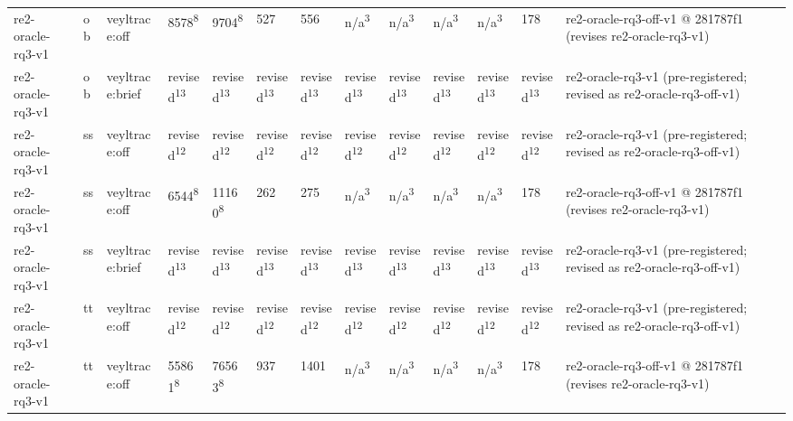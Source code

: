 \begin{table}[t]
\begin{tabular}{lllllllllllll}
re2-oracle-rq3-v1 & ob & veyltrace:off & 8578\textsuperscript{8} & 9704\textsuperscript{8} & 527 & 556 & n/a\textsuperscript{3} & n/a\textsuperscript{3} & n/a\textsuperscript{3} & n/a\textsuperscript{3} & 178 & re2-oracle-rq3-off-v1 @ 281787f1 (revises re2-oracle-rq3-v1) \\
re2-oracle-rq3-v1 & ob & veyltrace:brief & revised\textsuperscript{13} & revised\textsuperscript{13} & revised\textsuperscript{13} & revised\textsuperscript{13} & revised\textsuperscript{13} & revised\textsuperscript{13} & revised\textsuperscript{13} & revised\textsuperscript{13} & revised\textsuperscript{13} & re2-oracle-rq3-v1 (pre-registered; revised as re2-oracle-rq3-off-v1) \\
re2-oracle-rq3-v1 & ss & veyltrace:off & revised\textsuperscript{12} & revised\textsuperscript{12} & revised\textsuperscript{12} & revised\textsuperscript{12} & revised\textsuperscript{12} & revised\textsuperscript{12} & revised\textsuperscript{12} & revised\textsuperscript{12} & revised\textsuperscript{12} & re2-oracle-rq3-v1 (pre-registered; revised as re2-oracle-rq3-off-v1) \\
re2-oracle-rq3-v1 & ss & veyltrace:off & 6544\textsuperscript{8} & 11160\textsuperscript{8} & 262 & 275 & n/a\textsuperscript{3} & n/a\textsuperscript{3} & n/a\textsuperscript{3} & n/a\textsuperscript{3} & 178 & re2-oracle-rq3-off-v1 @ 281787f1 (revises re2-oracle-rq3-v1) \\
re2-oracle-rq3-v1 & ss & veyltrace:brief & revised\textsuperscript{13} & revised\textsuperscript{13} & revised\textsuperscript{13} & revised\textsuperscript{13} & revised\textsuperscript{13} & revised\textsuperscript{13} & revised\textsuperscript{13} & revised\textsuperscript{13} & revised\textsuperscript{13} & re2-oracle-rq3-v1 (pre-registered; revised as re2-oracle-rq3-off-v1) \\
re2-oracle-rq3-v1 & tt & veyltrace:off & revised\textsuperscript{12} & revised\textsuperscript{12} & revised\textsuperscript{12} & revised\textsuperscript{12} & revised\textsuperscript{12} & revised\textsuperscript{12} & revised\textsuperscript{12} & revised\textsuperscript{12} & revised\textsuperscript{12} & re2-oracle-rq3-v1 (pre-registered; revised as re2-oracle-rq3-off-v1) \\
re2-oracle-rq3-v1 & tt & veyltrace:off & 55861\textsuperscript{8} & 76563\textsuperscript{8} & 937 & 1401 & n/a\textsuperscript{3} & n/a\textsuperscript{3} & n/a\textsuperscript{3} & n/a\textsuperscript{3} & 178 & re2-oracle-rq3-off-v1 @ 281787f1 (revises re2-oracle-rq3-v1) \\

\end{tabular}
\end{table}
